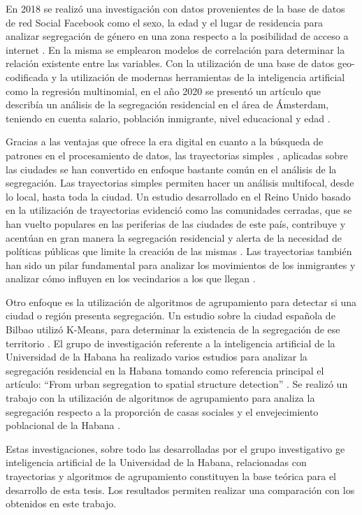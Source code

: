 En 2018 se realizó una investigación con datos provenientes de la base de datos de red Social Facebook como el sexo, la edad y el lugar de residencia para analizar segregación de género en una zona respecto a la posibilidad de acceso a internet \cite{Fatehkia2018UsingFA}. En la misma se emplearon modelos de correlación para determinar la relación existente entre las variables. Con la utilización de una base de datos geo-codificada y la utilización de modernas herramientas de la inteligencia artificial como la regresión multinomial, en el año 2020 se presentó un artículo que describía un análisis de la segregación residencial en el área de Ámsterdam, teniendo en cuenta salario, población inmigrante, nivel educacional y edad \cite{Boterman2020MultipleDO}. 

Gracias a las ventajas que ofrece la era digital en cuanto a la búsqueda de patrones en el procesamiento de datos, las trayectorias simples \cite{RandonFurling2018FromUS}, aplicadas sobre las ciudades se han convertido en enfoque bastante común en el análisis de la segregación. Las trayectorias simples permiten hacer un análisis multifocal, desde lo local, hasta toda la ciudad. Un estudio desarrollado en el Reino Unido basado en la utilización de trayectorias evidenció como las comunidades cerradas, que se han vuelto populares en las periferias de las ciudades de este país, contribuye y acentúan en gran manera la segregación residencial y alerta de la necesidad de políticas públicas que limite la creación de las mismas \cite{Atkinson2003FortressUG}. Las trayectorias también han sido un pilar fundamental para analizar los movimientos de los inmigrantes y analizar cómo influyen en los vecindarios a los que llegan \cite{Vogiazides2019MigrantsLR}. 

Otro enfoque es la utilización de algoritmos de agrupamiento para detectar si una ciudad o región presenta segregación. Un estudio sobre la ciudad española de Bilbao utilizó K-Means, para determinar la existencia de la segregación de ese territorio \cite{AguadoMoralejo2019AplicacinDU}. El grupo de investigación referente a la inteligencia artificial de la Universidad de la Habana ha realizado varios estudios para analizar la segregación residencial en la Habana tomando como referencia principal el artículo: “From urban segregation to spatial structure detection” \cite{RandonFurling2018FromUS}. Se realizó un trabajo con la utilización de algoritmos de agrupamiento para analiza la segregación respecto a la proporción de casas sociales y el envejecimiento poblacional de la Habana \cite{G2019}.

Estas investigaciones, sobre todo las desarrolladas por el grupo investigativo ge inteligencia artificial de la Universidad de la Habana, relacionadas con trayectorias y algoritmos de agrupamiento constituyen la base teórica para el desarrollo de esta tesis. Los resultados permiten realizar una comparación con los obtenidos en este trabajo.












  
